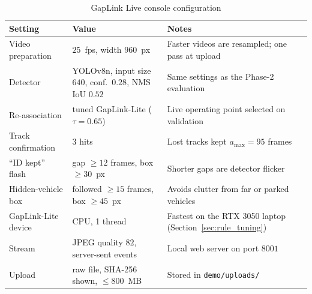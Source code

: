\begin{table}[H]
    \centering
    \caption{GapLink Live console configuration}
    \label{tab:vms_cfg}
    \begin{tabularx}{\textwidth}{l >{\raggedright\arraybackslash}p{5.4cm} >{\raggedright\arraybackslash}X}
        \toprule
        \textbf{Setting} & \textbf{Value} & \textbf{Notes} \\
        \midrule
        Video preparation & $25$~fps, width $960$~px & Faster videos are resampled; one pass at upload \\
        Detector & YOLOv8n, input size $640$, conf.\ $0.28$, NMS IoU $0.52$ & Same settings as the Phase-2 evaluation \\
        Re-association & tuned GapLink-Lite ($\tau = 0.65$) & Live operating point selected on validation \\
        Track confirmation & $3$ hits & Lost tracks kept $a_{\max} = 95$ frames \\
        ``ID kept'' flash & gap $\ge 12$ frames, box $\ge 30$~px & Shorter gaps are detector flicker \\
        Hidden-vehicle box & followed $\ge 15$ frames, box $\ge 45$~px & Avoids clutter from far or parked vehicles \\
        GapLink-Lite device & CPU, 1 thread & Fastest on the RTX 3050 laptop (Section~\ref{sec:rule_tuning}) \\
        Stream & JPEG quality $82$, server-sent events & Local web server on port $8001$ \\
        Upload & raw file, SHA-256 shown, $\le 800$~MB & Stored in \texttt{demo/uploads/} \\
        \bottomrule
    \end{tabularx}
\end{table}
